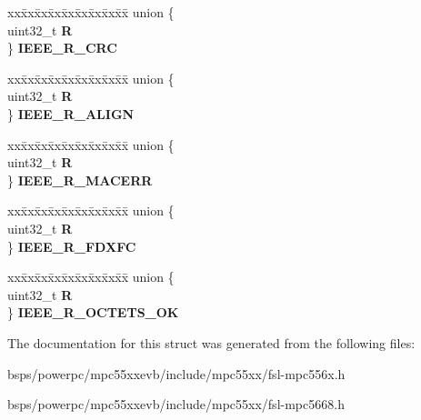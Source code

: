 \begin{DoxyCompactItemize}
\begin{tabbing}
\end{tabbing}\item 
\mbox{\label{structFEC__tag_a87b5bfb63ce6e655ec818c42e03c901f}} 
\begin{tabbing}
xx\=xx\=xx\=xx\=xx\=xx\=xx\=xx\=xx\=\kill
union \{\\
\>uint32\_t {\bfseries R}\\
\} {\bfseries IEEE\_R\_CRC}\\

\end{tabbing}\item 
\mbox{\label{structFEC__tag_a3a15383458204375348b910c6a22dcc4}} 
\begin{tabbing}
xx\=xx\=xx\=xx\=xx\=xx\=xx\=xx\=xx\=\kill
union \{\\
\>uint32\_t {\bfseries R}\\
\} {\bfseries IEEE\_R\_ALIGN}\\

\end{tabbing}\item 
\mbox{\label{structFEC__tag_aa55bb00a71f006a4d3820430cf84a457}} 
\begin{tabbing}
xx\=xx\=xx\=xx\=xx\=xx\=xx\=xx\=xx\=\kill
union \{\\
\>uint32\_t {\bfseries R}\\
\} {\bfseries IEEE\_R\_MACERR}\\

\end{tabbing}\item 
\mbox{\label{structFEC__tag_a12157e9648ca7504a07a125b2d3cd158}} 
\begin{tabbing}
xx\=xx\=xx\=xx\=xx\=xx\=xx\=xx\=xx\=\kill
union \{\\
\>uint32\_t {\bfseries R}\\
\} {\bfseries IEEE\_R\_FDXFC}\\

\end{tabbing}\item 
\mbox{\label{structFEC__tag_a81e107ab43430a3b39154e341c21a72a}} 
\begin{tabbing}
xx\=xx\=xx\=xx\=xx\=xx\=xx\=xx\=xx\=\kill
union \{\\
\>uint32\_t {\bfseries R}\\
\} {\bfseries IEEE\_R\_OCTETS\_OK}\\

\end{tabbing}\end{DoxyCompactItemize}


The documentation for this struct was generated from the following files\+:\begin{DoxyCompactItemize}
\item 
bsps/powerpc/mpc55xxevb/include/mpc55xx/fsl-\/mpc556x.\+h\item 
bsps/powerpc/mpc55xxevb/include/mpc55xx/fsl-\/mpc5668.\+h\end{DoxyCompactItemize}

